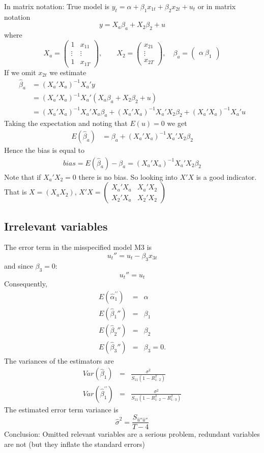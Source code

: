\documentclass{article}
\begin{document}
In matrix notation: True model is $y_t = \alpha + \beta_1 x_{1t} + \beta_2 x_{2t} + u_t$ or in matrix notation
$$y = X_a \beta_a + X_2 \beta_2 + u$$
where $$
X_a = \begin{pmatrix}
1 & x_{11}\\
\vdots & \vdots\\
1 & x_{1T}
\end{pmatrix}, \qquad 
X_2 = \begin{pmatrix}
x_{21}\\
\vdots\\
x_{2T}
\end{pmatrix},\quad
\beta_a = \begin{pmatrix}
\alpha\
\beta_1
\end{pmatrix}
$$
If we omit $x_{2t}$ we estimate
\begin{align*}
\hat{\beta}_a &= (X_a'X_a)^{-1} X_a'y\\
&= (X_a'X_a)^{-1} X_a'(X_a \beta_a + X_2 \beta_2+u)\\
&= (X_a'X_a)^{-1} X_a'X_a\beta_a + (X_a'X_a)^{-1} X_a'X_2 \beta_2 + (X_a'X_a)^{-1} X_a'u
\end{align*}
Taking the expectation and noting that $E(u)=0$ we get
\begin{align*}
E(\hat{\beta}_a) &= \beta_a + (X_a'X_a)^{-1} X_a'X_2 \beta_2
\end{align*}
Hence the bias is equal to
\begin{align*}
bias = E(\hat{\beta}_a) - \beta_a = (X_a'X_a)^{-1} X_a'X_2 \beta_2
\end{align*}
Note that if $X_a'X_2=0$ there is no bias. So looking into $X'X$ is a good indicator. That is $X = (X_a X_2)$, $X'X = \begin{pmatrix} X_a'X_a & X_a' X_2\\ X_2' X_a & X_2'X_2\end{pmatrix}$

\subsection*{Irrelevant variables}

The error term in the misspecified model M3 is
\[ u_{t}''=u_{t}-\beta _{3}x_{3t} \]
and since $\beta _{3}=0$:
\[ u_{t}''=u_{t} \]
Consequently,
\begin{eqnarray*}
E(\widehat{\alpha }_{1}^{\prime \prime }) &=&\alpha \\
E(\hat{\beta}_1'') &=&\beta_1 \\
E(\hat{\beta}_2'') &=&\beta_2 \\
E(\hat{\beta}_3'') &=&\beta_3=0.
\end{eqnarray*}
The variances of the estimators are
\begin{eqnarray*}
Var(\hat{\beta}_{1}) &=&\frac{\sigma ^{2}}{S_{11}\left( 1-R_{1\cdot
2}^{2}\right) } \\
Var(\hat{\beta}_{1}^{\prime \prime }) &=&\frac{\sigma ^{2}}{S_{11}\left(
1-R_{1\cdot 2}^{2}-R_{1\cdot 3}^{2}\right) }
\end{eqnarray*}
The estimated error term variance is
\[ \widehat{\sigma }^{2}=\frac{S_{\widehat{u}''\widehat{u}''}}{T-4} \]
Conclusion: Omitted relevant variables are a serious problem, redundant variables are not (but they inflate the standard errors)
\end{document}
